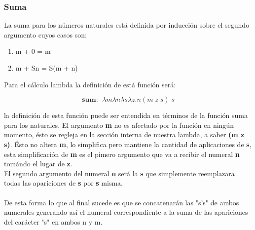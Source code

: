     \subsubsection{Suma}
        La suma para los números naturales está definida por inducción sobre el segundo argumento cuyos casos son:
        \begin{enumerate}
            \item m + 0 = m 
            \item m + Sn = S(m + n)
        \end{enumerate}

        Para el cálculo lambda la definición de está función será:
        \begin{definition}
            $$\textbf{sum: } \; \lambda m\lambda n\lambda s\lambda z.n(m \; z \; s) \; s$$
        \end{definition}

        la definición de esta función puede ser entendida en términos de la función suma para los naturales. El argumento \textbf{m} no es afectado por la función en ningún momento, ésto se regleja en la sección interna de nuestra lambda, a saber \textbf{(m z s)}. Ésto no altera \textbf{m}, lo simplifica pero mantiene la cantidad de aplicaciones de \textbf{s}, esta simplificación de \textbf{m} es el pimero argumento que va a recibir el numeral \textbf{n} tomándo el lugar de \textbf{z}.\\
        El segundo argumento del numeral \textbf{n} será la \textbf{s} que simplemente reemplazara todas las apariciones de \textbf{s} por \textbf{s} misma.\\\\
        De esta forma lo que al final sucede es que se concatenarán las "s's" de ambos numerales generando así el numeral correspondiente a la suma de las apariciones del carácter "s" en ambos n y m.\\


